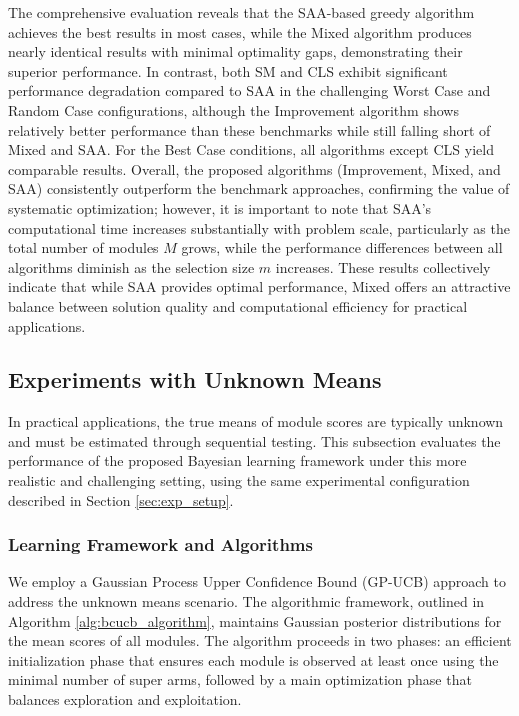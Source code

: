 \documentclass[opre,sglanonrev]{informs4}
\begin{document}
The comprehensive evaluation reveals that the SAA-based greedy algorithm achieves the best results in most cases, while the Mixed algorithm produces nearly identical results with minimal optimality gaps, demonstrating their superior performance. In contrast, both SM and CLS exhibit significant performance degradation compared to SAA in the challenging Worst Case and Random Case configurations, although the Improvement algorithm shows relatively better performance than these benchmarks while still falling short of Mixed and SAA. For the Best Case conditions, all algorithms except CLS yield comparable results. Overall, the proposed algorithms (Improvement, Mixed, and SAA) consistently outperform the benchmark approaches, confirming the value of systematic optimization; however, it is important to note that SAA's computational time increases substantially with problem scale, particularly as the total number of modules $M$ grows, while the performance differences between all algorithms diminish as the selection size $m$ increases. These results collectively indicate that while SAA provides optimal performance, Mixed offers an attractive balance between solution quality and computational efficiency for practical applications.

\subsection{Experiments with Unknown Means}
\label{sec:unknown_means}

In practical applications, the true means of module scores are typically unknown and must be estimated through sequential testing. This subsection evaluates the performance of the proposed Bayesian learning framework under this more realistic and challenging setting, using the same experimental configuration described in Section \ref{sec:exp_setup}.

\subsubsection{Learning Framework and Algorithms}

We employ a Gaussian Process Upper Confidence Bound (GP-UCB) approach to address the unknown means scenario. The algorithmic framework, outlined in Algorithm \ref{alg:bcucb_algorithm}, maintains Gaussian posterior distributions for the mean scores of all modules. The algorithm proceeds in two phases: an efficient initialization phase that ensures each module is observed at least once using the minimal number of super arms, followed by a main optimization phase that balances exploration and exploitation.
\end{document}
